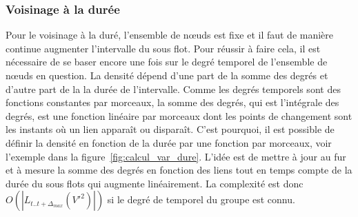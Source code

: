 \subsubsection{Voisinage à la durée}
Pour le voisinage à la duré, l'ensemble de n\oe uds est fixe et il faut de manière continue augmenter l'intervalle du sous flot.
Pour réussir à faire cela, il est nécessaire de se baser encore une fois sur le degré temporel de l'ensemble de n\oe uds en question.
La densité dépend d'une part de la somme des degrés et d'autre part de la la durée de l'intervalle.
Comme les degrés temporels sont des fonctions constantes par morceaux, la somme des degrés, qui est l'intégrale des degrés, est une fonction linéaire par morceaux dont les points de changement sont les instants où un lien apparaît ou disparaît.
C'est pourquoi, il est possible de définir la densité en fonction de la durée par une fonction par morceaux, voir l'exemple dans la figure~\ref{fig:calcul_var_dure}.
L'idée est de mettre à jour au fur et à mesure la somme des degrés en fonction des liens tout en temps compte de la durée du sous flots qui augmente linéairement.
La complexité est donc $O(|L_{t..t+\Delta_{max}}(V'^2)|)$ si le degré de temporel du groupe est connu.

